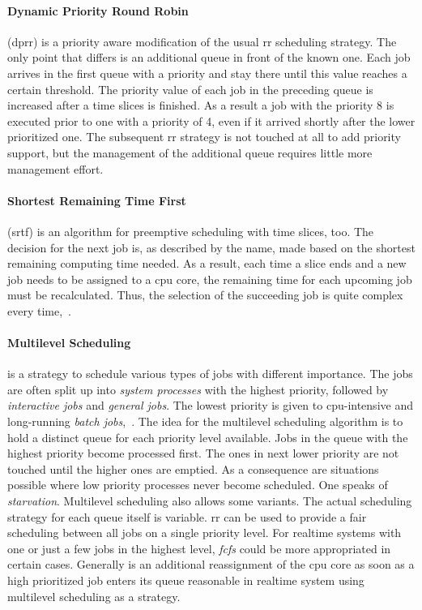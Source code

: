 \paragraph{Dynamic Priority Round Robin}
(\ac{dprr}) is a priority aware modification of the usual \ac{rr} scheduling strategy.
The only point that differs is an additional queue in front of the known one.
Each job arrives in the first queue with a priority and stay there until this value reaches a certain threshold.
The priority value of each job in the preceding queue is increased after a time slices is finished.
As a result a job with the priority 8 is executed prior to one with a priority of 4, even if it arrived shortly after the lower prioritized one.
The subsequent \ac{rr} strategy is not touched at all to add priority support, but the management of the additional queue requires little more management effort\cite{brause2017betriebssysteme}.

\paragraph{Shortest Remaining Time First}
(\ac{srtf}) is an algorithm for preemptive scheduling with time slices, too.
The decision for the next job is, as described by the name, made based on the shortest remaining computing time needed.
As a result, each time a slice ends and a new job needs to be assigned to a \ac{cpu} core, the remaining time for each upcoming job must be recalculated. 
Thus, the selection of the succeeding job is quite complex every time\cite{brause2017betriebssysteme},~\cite{glatz2015betriebssysteme}.

\paragraph{Multilevel Scheduling}
is a strategy to schedule various types of jobs with different importance.
The jobs are often split up into \textit{system processes} with the highest priority, followed by \textit{interactive jobs} and \textit{general jobs}. 
The lowest priority is given to \ac{cpu}-intensive and long-running \textit{batch jobs}\cite{brause2017betriebssysteme},~\cite{mandl2014Grundkurs}.
The idea for the multilevel scheduling algorithm is to hold a distinct queue for each priority level available.
Jobs in the queue with the highest priority become processed first. 
The ones in next lower priority are not touched until the higher ones are emptied.
As a consequence are situations possible where low priority processes never become scheduled.
One speaks of \textit{starvation}\cite{glatz2015betriebssysteme}.
Multilevel scheduling also allows some variants.
The actual scheduling strategy for each queue itself is variable.
\ac{rr} can be used to provide a fair scheduling between all jobs on a single priority level.
For realtime systems with one or just a few jobs in the highest level, \textit{fcfs} could be more appropriated in certain cases.
Generally is an additional reassignment of the \ac{cpu} core as soon as a high prioritized job enters its queue reasonable in realtime system using multilevel scheduling as a strategy\cite{glatz2015betriebssysteme}.

